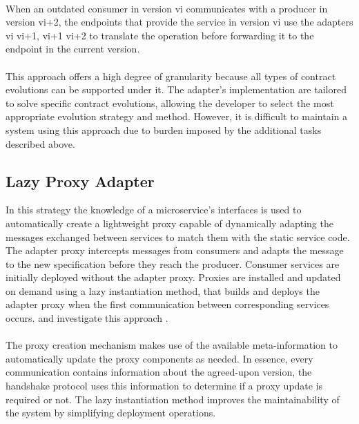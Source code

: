 \paragraph{}

When an outdated consumer in version vi communicates with a producer in version vi+2, the endpoints that provide the service
in version vi use the adapters vi \textrightarrow vi+1, vi+1 \textrightarrow vi+2 to translate the operation before forwarding it to the endpoint in the current version.

\paragraph{}

This approach offers a high degree of granularity because all types of contract evolutions can be supported under it.
The adapter's implementation are tailored to solve specific contract evolutions, allowing the developer to select the most appropriate evolution strategy and method.
However, it is difficult to maintain a system using this approach due to burden imposed by the additional tasks described above.

\subsection{Lazy Proxy Adapter} %
\label{sec:proxy_adapter}

In this strategy the knowledge of a microservice’s
interfaces is used to automatically create a lightweight proxy capable of dynamically adapting the messages exchanged between services to match them with the static service code.
The adapter proxy intercepts messages from consumers and adapts the message to the new specification before they reach the producer.
Consumer services are initially deployed without the adapter proxy.
Proxies are installed and updated on demand using a lazy instantiation method, that builds and deploys the adapter proxy when the first communication between corresponding services occurs.
\citeauthor{seco2020robust} and \citeauthor{santosregent} investigate this approach \cite{seco2020robust, santosregent}.

\paragraph{}

The proxy creation mechanism makes use of the available meta-information
to automatically update the proxy components as needed.
In essence, every communication contains information about the agreed-upon version, the handshake protocol uses this information to determine if a proxy update is required or not.
The lazy instantiation method improves the maintainability of the system by
simplifying deployment operations.

